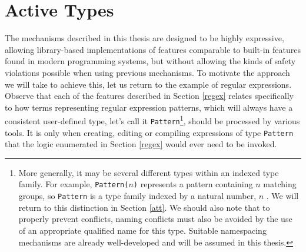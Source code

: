 \section{Active Types}\label{contributions}
The mechanisms described in this thesis are designed to be highly {expressive}, allowing library-based implementations of features comparable to built-in features found in modern programming systems, but without allowing the kinds of {safety} violations possible when using previous mechanisms. %
To motivate the approach we will take to achieve this, let us return to the example of regular expressions. Observe that each of the features described in Section \ref{regex} relates specifically to how terms representing regular expression patterns, which will always have a consistent user-defined type, let's call it \verb|Pattern|\footnote{More generally, it may be several different types within an indexed type family. For example, \texttt{Pattern(}$n$\texttt{)}  represents a pattern containing $n$ matching groups, so \texttt{Pattern} is  a type family indexed by a natural number, $n$ \cite{regex-type-system}. We will return to this distinction in Section \ref{att}. We should also note that to properly prevent conflicts, naming conflicts must also be avoided by the use of an appropriate qualified name for this type. Suitable namespacing mechanisms are already well-developed and will be assumed in this thesis.}, should be processed by various tools. %
It is only when creating, editing or compiling expressions of type \verb|Pattern| that the logic enumerated in Section \ref{regex} would ever need to be invoked. 

